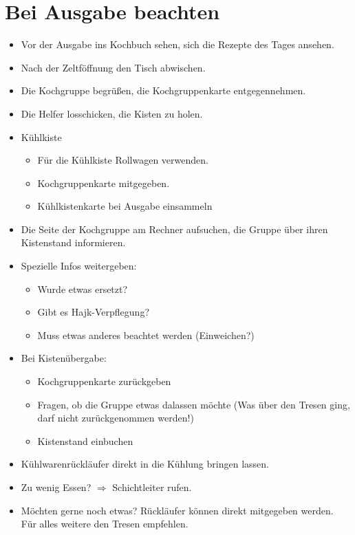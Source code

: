 \documentclass[a4paper]{scrartcl}
\begin{document}
\section*{Bei Ausgabe beachten}
\label{sec:bei-ausgabe-beachten}
\begin{itemize}
\item Vor der Ausgabe ins Kochbuch sehen, sich die Rezepte des Tages ansehen.
\item Nach der Zeltföffnung den Tisch abwischen.
\item Die Kochgruppe begrüßen, die Kochgruppenkarte entgegennehmen.
\item Die Helfer losschicken, die Kisten zu holen.
\item Kühlkiste
  \begin{itemize}
  \item Für die Kühlkiste Rollwagen verwenden.
  \item Kochgruppenkarte mitgegeben.
  \item Kühlkistenkarte bei Ausgabe einsammeln 
  \end{itemize}
\item Die Seite der Kochgruppe am Rechner aufsuchen, die Gruppe über ihren Kistenstand informieren.
\item Spezielle Infos weitergeben:
  \begin{itemize}
  \item Wurde etwas ersetzt?
  \item Gibt es Hajk-Verpflegung?
  \item Muss etwas anderes beachtet werden (Einweichen?)
  \end{itemize}
\item Bei Kistenübergabe: \begin{itemize}
  \item Kochgruppenkarte zurückgeben
  \item Fragen, ob die Gruppe etwas dalassen möchte (Was über den Tresen ging, darf nicht zurückgenommen werden!)
  \item Kistenstand einbuchen
  \end{itemize}
\item Kühlwarenrückläufer direkt in die Kühlung bringen lassen.
\item Zu wenig Essen? $\Rightarrow$ Schichtleiter rufen.
\item Möchten gerne noch etwas? Rückläufer können direkt mitgegeben werden.  Für alles weitere den Tresen empfehlen.
\end{itemize}
\end{document}
